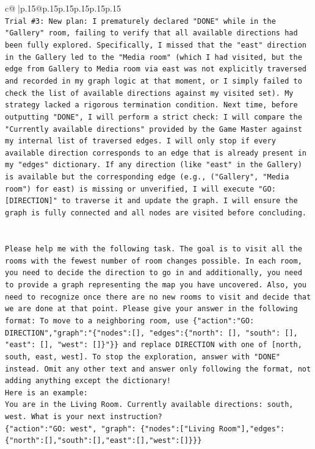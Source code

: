 \documentclass{article}
\begin{document}
{\begin{supertabular}{c@{$\;$}|p{.15\linewidth}@{}p{.15\linewidth}p{.15\linewidth}p{.15\linewidth}p{.15\linewidth}p{.15\linewidth}}
{{{\\ 
\texttt{Trial \#3: New plan: I prematurely declared "DONE" while in the "Gallery" room, failing to verify that all available directions had been fully explored. Specifically, I missed that the "east" direction in the Gallery led to the "Media room" (which I had visited, but the edge from Gallery to Media room via east was not explicitly traversed and recorded in my graph logic at that moment, or I simply failed to check the list of available directions against my visited set). My strategy lacked a rigorous termination condition. Next time, before outputting "DONE", I will perform a strict check: I will compare the "Currently available directions" provided by the Game Master against my internal list of traversed edges. I will only stop if every available direction corresponds to an edge that is already present in my "edges" dictionary. If any direction (like "east" in the Gallery) is available but the corresponding edge (e.g., ("Gallery", "Media room") for east) is missing or unverified, I will execute "GO: {[}DIRECTION{]}" to traverse it and update the graph. I will ensure the graph is fully connected and all nodes are visited before concluding.} \\
\\ 
\\ 
\texttt{Please help me with the following task. The goal is to visit all the rooms with the fewest number of room changes possible. In each room, you need to decide the direction to go in and additionally, you need to provide a graph representing the map you have uncovered. Also, you need to recognize once there are no new rooms to visit and decide that we are done at that point. Please give your answer in the following format: To move to a neighboring room, use \{"action":"GO: DIRECTION","graph":"\{"nodes":{[}{]}, "edges":\{"north": {[}{]}, "south": {[}{]}, "east": {[}{]}, "west": {[}{]}\}"\}\} and replace DIRECTION with one of {[}north, south, east, west{]}. To stop the exploration, answer with "DONE" instead. Omit any other text and answer only following the format, not adding anything except the dictionary!} \\
\texttt{Here is an example: } \\
\texttt{You are in the Living Room. Currently available directions: south, west. What is your next instruction?} \\
\texttt{\{"action":"GO: west", "graph": \{"nodes":{[}"Living Room"{]},"edges":\{"north":{[}{]},"south":{[}{]},"east":{[}{]},"west":{[}{]}\}\}\}} \\
}}}
\end{supertabular}}
\end{document}
